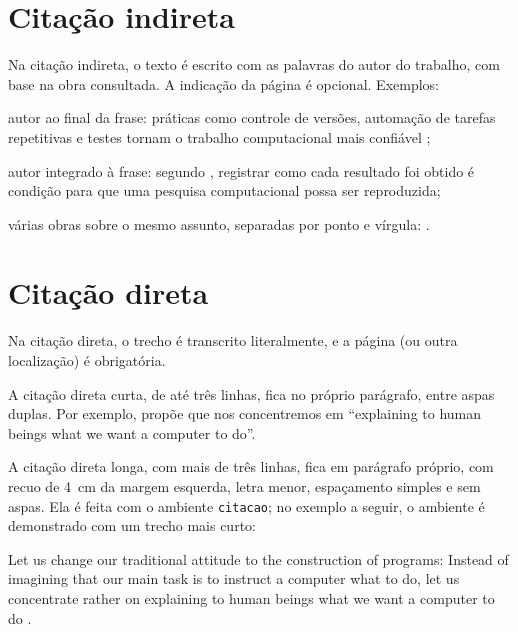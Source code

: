 \section{Citação indireta}\label{sec:citacao-indireta}

Na citação indireta, o texto é escrito com as palavras do autor do trabalho, com base na obra consultada. A indicação da página é opcional. Exemplos:

\begin{alineas}
	\item autor ao final da frase: práticas como controle de versões, automação de tarefas repetitivas e testes tornam o trabalho computacional mais confiável \cite{wilson2014};
	\item autor integrado à frase: segundo , registrar como cada resultado foi obtido é condição para que uma pesquisa computacional possa ser reproduzida;
	\item várias obras sobre o mesmo assunto, separadas por ponto e vírgula: \cite{wilson2014,wilson2017,sandve2013}.
\end{alineas}

\section{Citação direta}\label{sec:citacao-direta}

Na citação direta, o trecho é transcrito literalmente, e a página (ou outra localização) é obrigatória.

A citação direta curta, de até três linhas, fica no próprio parágrafo, entre aspas duplas. Por exemplo,  propõe que nos concentremos em ``explaining to human beings what we want a computer to do''.

A citação direta longa, com mais de três linhas, fica em parágrafo próprio, com recuo de \SI{4}{\centi\metre} da margem esquerda, letra menor, espaçamento simples e sem aspas. Ela é feita com o ambiente \texttt{citacao}; no exemplo a seguir, o ambiente é demonstrado com um trecho mais curto:

\begin{citacao}[english]
Let us change our traditional attitude to the construction of programs: Instead of imagining that our main task is to instruct a computer what to do, let us concentrate rather on explaining to human beings what we want a computer to do \cite[p.~97]{knuth1984literate}.
\end{citacao}

